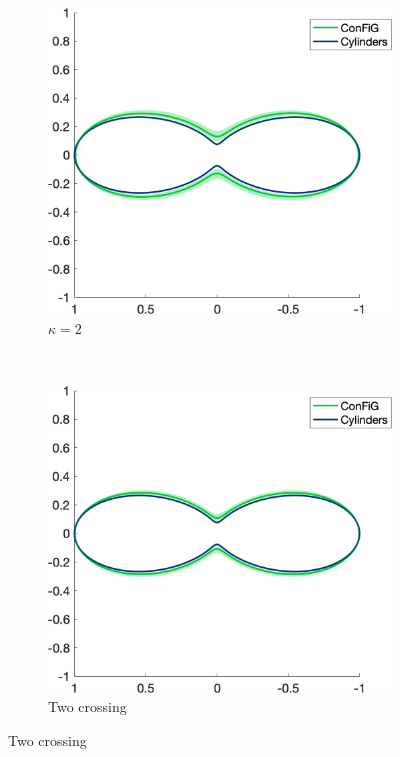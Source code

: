 \begin{figure}[h!]
  \begin{subfigure}[]{0.4\textwidth}
    \includegraphics[width=\textwidth]{figures/frf_experiment/fibres_prctiles_kappa_2_b_2000.png}
    \caption{$\kappa = 2$}
  \end{subfigure}
  ~
  \begin{subfigure}[]{0.4\textwidth}
    \includegraphics[width=\textwidth]{figures/frf_experiment/twoperp_prctiles_b_2000.png}
    \caption{Two crossing}
  \end{subfigure}


\end{figure}
